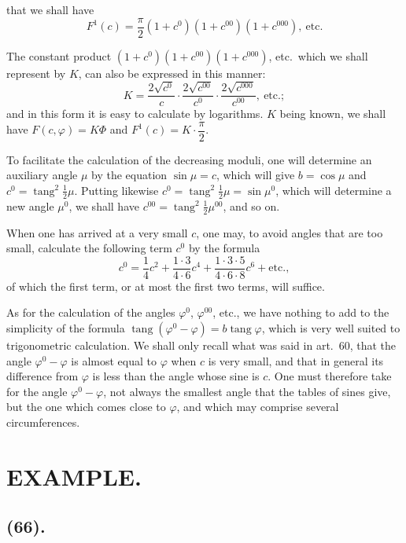 \documentclass{article}
\begin{document}
that we shall have
\[ F^{1}(c)=\frac{\pi}{2}(1+c^{0})(1+c^{00})(1+c^{000}),\ \text{etc.} \]

The constant product $(1+c^{0})(1+c^{00})(1+c^{000})$, etc.\ which we shall represent by $K$, can also be expressed in this manner:
\[ K=\frac{2\sqrt{c^{0}}}{c}\cdot\frac{2\sqrt{c^{00}}}{c^{0}}\cdot\frac{2\sqrt{c^{000}}}{c^{00}},\ \text{etc.}; \]
and in this form it is easy to calculate by logarithms. $K$ being known, we shall have $F(c,\varphi)=K\Phi$ and $F^{1}(c)=K\cdot\dfrac{\pi}{2}$.

To facilitate the calculation of the decreasing moduli, one will determine an auxiliary angle $\mu$ by the equation $\sin\mu=c$, which will give $b=\cos\mu$ and $c^{0}=\operatorname{tang}^{2}\frac{1}{2}\mu$. Putting likewise $c^{0}=\operatorname{tang}^{2}\frac{1}{2}\mu=\sin\mu^{0}$, which will determine a new angle $\mu^{0}$, we shall have $c^{00}=\operatorname{tang}^{2}\frac{1}{2}\mu^{00}$, and so on.

When one has arrived at a very small $c$, one may, to avoid angles that are too small, calculate the following term $c^{0}$ by the formula
\[ c^{0}=\frac{1}{4}c^{2}+\frac{1\cdot3}{4\cdot6}c^{4}+\frac{1\cdot3\cdot5}{4\cdot6\cdot8}c^{6}+\text{etc.}, \]
of which the first term, or at most the first two terms, will suffice.

As for the calculation of the angles $\varphi^{0}$, $\varphi^{00}$, etc., we have nothing to add to the simplicity of the formula $\operatorname{tang}(\varphi^{0}-\varphi)=b\operatorname{tang}\varphi$, which is very well suited to trigonometric calculation. We shall only recall what was said in art.~60, that the angle $\varphi^{0}-\varphi$ is almost equal to $\varphi$ when $c$ is very small, and that in general its difference from $\varphi$ is less than the angle whose sine is $c$. One must therefore take for the angle $\varphi^{0}-\varphi$, not always the smallest angle that the tables of sines give, but the one which comes close to $\varphi$, and which may comprise several circumferences.

\section*{EXAMPLE.}

\subsection*{(66).}
\end{document}
